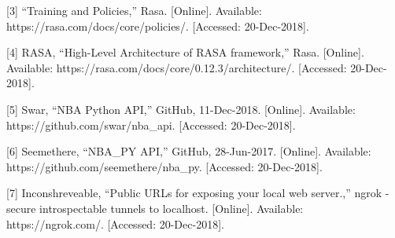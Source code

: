 \documentclass[conference]{IEEEtran}
\begin{document}
[3] 	“Training and Policies,” Rasa. [Online]. Available: https://rasa.com/docs/core/policies/. [Accessed: 20-Dec-2018].

[4] 	RASA, “High-Level Architecture of RASA framework,” Rasa. [Online]. Available: https://rasa.com/docs/core/0.12.3/architecture/. [Accessed: 20-Dec-2018].

[5] 	Swar, “NBA Python API,” GitHub, 11-Dec-2018. [Online]. Available: https://github.com/swar/nba\_api. [Accessed: 20-Dec-2018].

[6]	Seemethere, “NBA\_PY API,” GitHub, 28-Jun-2017. [Online]. Available: https://github.com/seemethere/nba\_py. [Accessed: 20-Dec-2018].

[7]	Inconshreveable, “Public URLs for exposing your local web server.,” ngrok - secure introspectable tunnels to localhost. [Online]. Available: https://ngrok.com/. 		   [Accessed: 20-Dec-2018].
\end{document}

